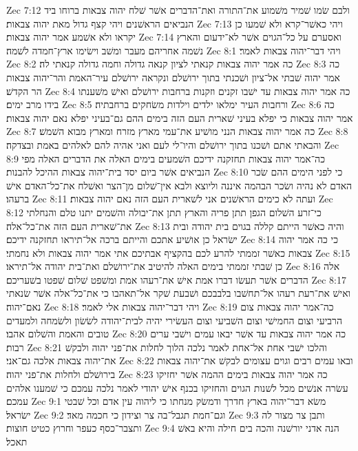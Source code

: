 Zec 7:12  ולבם שׂמו שׁמיר משׁמוע את־התורה ואת־הדברים אשׁר שׁלח יהוה צבאות ברוחו ביד הנביאים הראשׁנים ויהי קצף גדול מאת יהוה צבאות׃
Zec 7:13  ויהי כאשׁר־קרא ולא שׁמעו כן יקראו ולא אשׁמע אמר יהוה צבאות׃
Zec 7:14  ואסערם על כל־הגוים אשׁר לא־ידעום והארץ נשׁמה אחריהם מעבר ומשׁב וישׂימו ארץ־חמדה לשׁמה׃
Zec 8:1  ויהי דבר־יהוה צבאות לאמר׃
Zec 8:2  כה אמר יהוה צבאות קנאתי לציון קנאה גדולה וחמה גדולה קנאתי לה׃
Zec 8:3  כה אמר יהוה שׁבתי אל־ציון ושׁכנתי בתוך ירושׁלם ונקראה ירושׁלם עיר־האמת והר־יהוה צבאות הר הקדשׁ׃
Zec 8:4  כה אמר יהוה צבאות עד ישׁבו זקנים וזקנות ברחבות ירושׁלם ואישׁ משׁענתו בידו מרב ימים׃
Zec 8:5  ורחבות העיר ימלאו ילדים וילדות משׂחקים ברחבתיה׃
Zec 8:6  כה אמר יהוה צבאות כי יפלא בעיני שׁארית העם הזה בימים ההם גם־בעיני יפלא נאם יהוה צבאות׃
Zec 8:7  כה אמר יהוה צבאות הנני מושׁיע את־עמי מארץ מזרח ומארץ מבוא השׁמשׁ׃
Zec 8:8  והבאתי אתם ושׁכנו בתוך ירושׁלם והיו־לי לעם ואני אהיה להם לאלהים באמת ובצדקה׃
Zec 8:9  כה־אמר יהוה צבאות תחזקנה ידיכם השׁמעים בימים האלה את הדברים האלה מפי הנביאים אשׁר ביום יסד בית־יהוה צבאות ההיכל להבנות׃
Zec 8:10  כי לפני הימים ההם שׂכר האדם לא נהיה ושׂכר הבהמה איננה וליוצא ולבא אין־שׁלום מן־הצר ואשׁלח את־כל־האדם אישׁ ברעהו׃
Zec 8:11  ועתה לא כימים הראשׁנים אני לשׁארית העם הזה נאם יהוה צבאות׃
Zec 8:12  כי־זרע השׁלום הגפן תתן פריה והארץ תתן את־יבולה והשׁמים יתנו טלם והנחלתי את־שׁארית העם הזה את־כל־אלה׃
Zec 8:13  והיה כאשׁר הייתם קללה בגוים בית יהודה ובית ישׂראל כן אושׁיע אתכם והייתם ברכה אל־תיראו תחזקנה ידיכם׃
Zec 8:14  כי כה אמר יהוה צבאות כאשׁר זממתי להרע לכם בהקציף אבתיכם אתי אמר יהוה צבאות ולא נחמתי׃
Zec 8:15  כן שׁבתי זממתי בימים האלה להיטיב את־ירושׁלם ואת־בית יהודה אל־תיראו׃
Zec 8:16  אלה הדברים אשׁר תעשׂו דברו אמת אישׁ את־רעהו אמת ומשׁפט שׁלום שׁפטו בשׁעריכם׃
Zec 8:17  ואישׁ את־רעת רעהו אל־תחשׁבו בלבבכם ושׁבעת שׁקר אל־תאהבו כי את־כל־אלה אשׁר שׂנאתי נאם־יהוה׃
Zec 8:18  ויהי דבר־יהוה צבאות אלי לאמר׃
Zec 8:19  כה־אמר יהוה צבאות צום הרביעי וצום החמישׁי וצום השׁביעי וצום העשׂירי יהיה לבית־יהודה לשׂשׂון ולשׂמחה ולמעדים טובים והאמת והשׁלום אהבו׃
Zec 8:20  כה אמר יהוה צבאות עד אשׁר יבאו עמים וישׁבי ערים רבות׃
Zec 8:21  והלכו ישׁבי אחת אל־אחת לאמר נלכה הלוך לחלות את־פני יהוה ולבקשׁ את־יהוה צבאות אלכה גם־אני׃
Zec 8:22  ובאו עמים רבים וגוים עצומים לבקשׁ את־יהוה צבאות בירושׁלם ולחלות את־פני יהוה׃
Zec 8:23  כה אמר יהוה צבאות בימים ההמה אשׁר יחזיקו עשׂרה אנשׁים מכל לשׁנות הגוים והחזיקו בכנף אישׁ יהודי לאמר נלכה עמכם כי שׁמענו אלהים עמכם׃
Zec 9:1  משׂא דבר־יהוה בארץ חדרך ודמשׂק מנחתו כי ליהוה עין אדם וכל שׁבטי ישׂראל׃
Zec 9:2  וגם־חמת תגבל־בה צר וצידון כי חכמה מאד׃
Zec 9:3  ותבן צר מצור לה ותצבר־כסף כעפר וחרוץ כטיט חוצות׃
Zec 9:4  הנה אדני יורשׁנה והכה בים חילה והיא באשׁ תאכל׃
